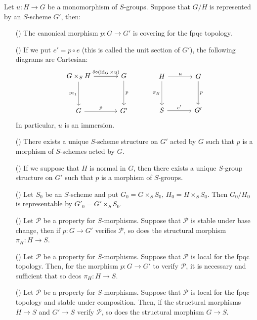 \begin{proposition}\label{scheme group fpqc quotient of monomorphism representable prop}
Let $u:H\to G$ be a monomorphism of $S$-groups. Suppose that $G/H$ is represented by an $S$-scheme $G'$, then:
\begin{enumerate}
    \item[(\rmnum{1})] The canonical morphism $p:G\to G'$ is covering for the fpqc topology.
    \item[(\rmnum{2})] If we put $e'=p\circ e$ (this is called the unit section of $G'$), the following diagrams are Cartesian:
    \[\begin{tikzcd}[column sep=12mm, row sep=12mm]
    G\times_SH\ar[r,"\delta\circ(\id_G\times u)"]\ar[d,swap,"\pr_1"]&G\ar[d,"p"]\\
    G\ar[r,"p"]&G'
    \end{tikzcd}\quad\quad\quad\begin{tikzcd}[column sep=12mm, row sep=12mm]
    H\ar[r,"u"]\ar[d,swap,"\pi_H"]&G\ar[d,"p"]\\
    S\ar[r,"e'"]&G'
    \end{tikzcd}\]
    In particular, $u$ is an immersion.
    \item[(\rmnum{3})] There exists a unique $S$-scheme structure on $G'$ acted by $G$ such that $p$ is a morphism of $S$-schemes acted by $G$.
    \item[(\rmnum{4})] If we suppose that $H$ is normal in $G$, then there exists a unique $S$-group structure on $G'$ such that $p$ is a morphism of $S$-groups.
    \item[(\rmnum{5})] Let $S_0$ be an $S$-scheme and put $G_0=G\times_SS_0$, $H_0=H\times_SS_0$. Then $G_0/H_0$ is representable by $G'_0=G'\times_SS_0$.
    \item[(\rmnum{6})] Let $\mathcal{P}$ be a property for $S$-morphisms. Suppose that $\mathcal{P}$ is stable under base change, then if $p:G\to G'$ verifies $\mathcal{P}$, so does the structural morphism $\pi_H:H\to S$.
    \item[(\rmnum{7})] Let $\mathcal{P}$ be a property for $S$-morphisms. Suppose that $\mathcal{P}$ is local for the fpqc topology. Then, for the morphism $p:G\to G'$ to verify $\mathcal{P}$, it is necessary and sufficient that so deos $\pi_H:H\to S$.
    \item[(\rmnum{8})] Let $\mathcal{P}$ be a property for $S$-morphisms. Suppose that $\mathcal{P}$ is local for the fpqc topology and stable under composition. Then, if the structural morphisms $H\to S$ and $G'\to S$ verify $\mathcal{P}$, so does the structural morphism $G\to S$.

\end{enumerate}
\end{proposition}
